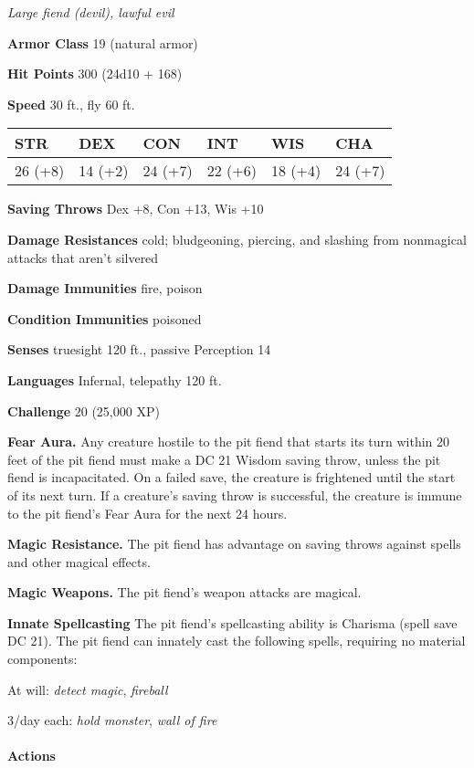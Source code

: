 \documentclass[
]{article}
\begin{document}
\emph{Large fiend (devil), lawful evil}

\textbf{Armor Class} 19 (natural armor)

\textbf{Hit Points} 300 (24d10 + 168)

\textbf{Speed} 30 ft., fly 60 ft.

\begin{longtable}[]{@{}llllll@{}}
\toprule
STR & DEX & CON & INT & WIS & CHA\tabularnewline
\midrule
\endhead
26 (+8) & 14 (+2) & 24 (+7) & 22 (+6) & 18 (+4) & 24 (+7)\tabularnewline
\bottomrule
\end{longtable}

\textbf{Saving Throws} Dex +8, Con +13, Wis +10

\textbf{Damage Resistances} cold; bludgeoning, piercing, and slashing
from nonmagical attacks that aren't silvered

\textbf{Damage Immunities} fire, poison

\textbf{Condition Immunities} poisoned

\textbf{Senses} truesight 120 ft., passive Perception 14

\textbf{Languages} Infernal, telepathy 120 ft.

\textbf{Challenge} 20 (25,000 XP)

\textbf{Fear Aura.} Any creature hostile to the pit fiend that starts
its turn within 20 feet of the pit fiend must make a DC 21 Wisdom saving
throw, unless the pit fiend is incapacitated. On a failed save, the
creature is frightened until the start of its next turn. If a creature's
saving throw is successful, the creature is immune to the pit fiend's
Fear Aura for the next 24 hours.

\textbf{Magic Resistance.} The pit fiend has advantage on saving throws
against spells and other magical effects.

\textbf{Magic Weapons.} The pit fiend's weapon attacks are magical.

\textbf{Innate Spellcasting} The pit fiend's spellcasting ability is
Charisma (spell save DC 21). The pit fiend can innately cast the
following spells, requiring no material components:

At will: \emph{detect magic}, \emph{fireball}

3/day each: \emph{hold monster}, \emph{wall of fire}

\hypertarget{actions-18}{%
\paragraph{Actions}\label{actions-18}}
\end{document}
